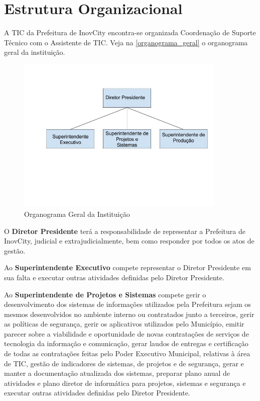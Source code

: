 \documentclass[        
    a4paper,          %
    12pt,             %
    chapter=TITLE,    %
    section=Title,    %
    subsection=Title, %
    oneside,          %
    english,          %
    spanish,          %
    brazil,           %
    sumario=abnt-6027-2012,
]{abntex2}
\newcommand{\EMPRESA}{Prefeitura de InovCity}
\begin{document}
\section{Estrutura Organizacional}
A TIC da \EMPRESA{} encontra-se organizada Coordena\c{c}\~ao de Suporte Técnico com o Assistente de TIC. Veja na 
\autoref{organograma_geral} o organograma geral da institui\c{c}\~ao.

\begin{figure}[H]
    \centering
    \caption{Organograma Geral da Institui\c{c}\~ao}\label{organograma_geral}
    \includegraphics[width=10cm]{figuras/organograma_antes}
\end{figure}


O \textbf{Diretor Presidente} terá a responsabilidade de representar a \EMPRESA{}, judicial e extrajudicialmente, bem como responder por 
todos os atos de gestão.

Ao \textbf{Superintendente Executivo} compete representar o Diretor Presidente em sua falta e executar outras atividades definidas pelo 
Diretor Presidente.

Ao \textbf{Superintendente de Projetos e Sistemas} compete gerir o desenvolvimento dos sistemas de informações utilizados pela Prefeitura 
sejam os mesmos desenvolvidos no ambiente interno ou contratados junto a terceiros, gerir as políticas de segurança, gerir os aplicativos 
utilizados pelo Município, emitir parecer sobre a viabilidade e oportunidade de novas contratações de serviços de tecnologia da informação 
e comunicação, gerar laudos de entregas e certificação de todas as contratações feitas pelo Poder Executivo Municipal, relativas à área de 
TIC, gestão de indicadores de sistemas, de projetos e de segurança, gerar e manter a documentação atualizada dos sistemas,
preparar plano anual de atividades e plano diretor de informática para projetos, sistemas e segurança e executar outras atividades 
definidas pelo Diretor Presidente.
\end{document}
